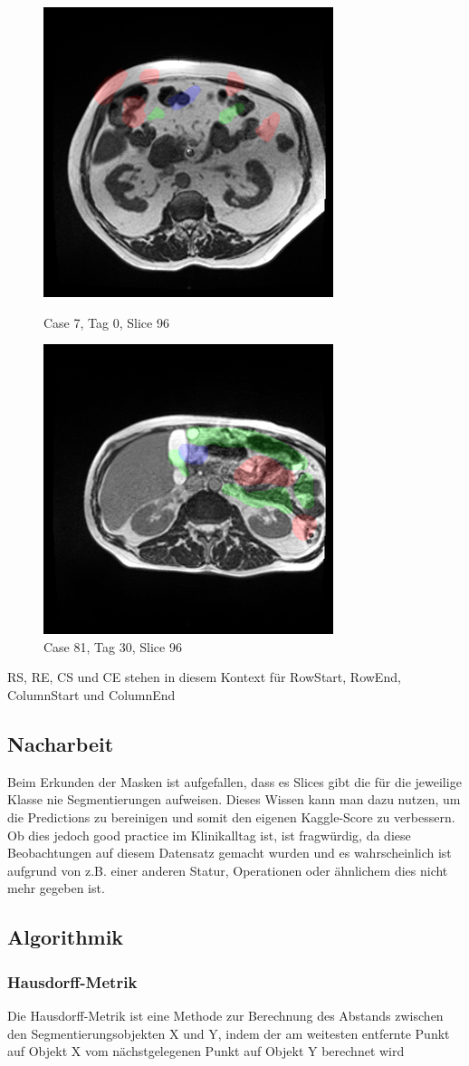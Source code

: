 \begin{figure}[htp]
\centering
\includegraphics[width=.25\textwidth]{bilder/case7-day0-slice-0096}\hfill
\caption{Case 7, Tag 0, Slice 96}
\includegraphics[width=.25\textwidth]{bilder/case81-day30-slice-0096}\hfill
\caption{Case 81, Tag 30, Slice 96}
\label{fig:cut}
\end{figure}

RS, RE, CS und CE stehen in diesem Kontext für RowStart, RowEnd, ColumnStart und ColumnEnd

\subsection{Nacharbeit}

Beim Erkunden der Masken ist aufgefallen, dass es Slices gibt die für die jeweilige Klasse nie Segmentierungen aufweisen. Dieses Wissen kann man dazu nutzen, um die Predictions zu bereinigen und somit den eigenen Kaggle-Score zu verbessern. Ob dies jedoch good practice im Klinikalltag ist, ist fragwürdig, da diese Beobachtungen auf diesem Datensatz gemacht wurden und es wahrscheinlich ist aufgrund von z.B. einer anderen Statur, Operationen oder ähnlichem dies nicht mehr gegeben ist.

\subsection{Algorithmik}

\subsubsection{Hausdorff-Metrik} \label{ssec:hdorff}
Die Hausdorff-Metrik ist eine Methode zur Berechnung des Abstands zwischen den Segmentierungsobjekten X und Y, indem der am weitesten entfernte Punkt auf Objekt X vom nächstgelegenen Punkt auf Objekt Y berechnet wird

